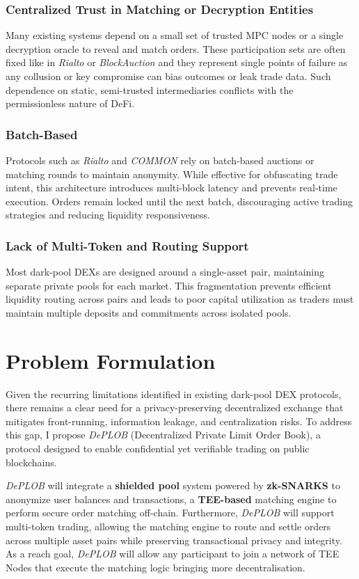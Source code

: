 \documentclass[12pt,a4paper]{article}
\begin{document}
\subsubsection{Centralized Trust in Matching or Decryption Entities}
Many existing systems depend on a small set of trusted MPC nodes or a single decryption oracle to reveal and match orders. These participation sets are often fixed like in \textit{Rialto} or \textit{BlockAuction} and they represent single points of failure as any collusion or key compromise can bias outcomes or leak trade data. Such dependence on static, semi-trusted intermediaries conflicts with the permissionless nature of DeFi.

\subsubsection{Batch-Based}
Protocols such as \textit{Rialto} and \textit{COMMON} rely on batch-based auctions or matching rounds to maintain anonymity. While effective for obfuscating trade intent, this architecture introduces multi-block latency and prevents real-time execution. Orders remain locked until the next batch, discouraging active trading strategies and reducing liquidity responsiveness. 

\subsubsection{Lack of Multi-Token and Routing Support}
Most dark-pool DEXs are designed around a single-asset pair, maintaining separate private pools for each market. This fragmentation prevents efficient liquidity routing across pairs and leads to poor capital utilization as traders must maintain multiple deposits and commitments across isolated pools.

\section{Problem Formulation}
Given the recurring limitations identified in existing dark-pool DEX protocols, there remains a clear need for a privacy-preserving decentralized exchange that mitigates front-running, information leakage, and centralization risks. To address this gap, I propose \textit{DePLOB} (Decentralized Private Limit Order Book), a protocol designed to enable confidential yet verifiable trading on public blockchains. 

\textit{DePLOB} will integrate a \textbf{shielded pool} system powered by \textbf{zk-SNARKS} to anonymize user balances and transactions, a \textbf{TEE-based} matching engine to perform secure order matching off-chain. Furthermore, \textit{DePLOB} will support multi-token trading, allowing the matching engine to route and settle orders across multiple asset pairs while preserving transactional privacy and integrity. As a reach goal, \textit{DePLOB} will allow any participant to join a network of TEE Nodes that execute the matching logic bringing more decentralisation.
\end{document}
